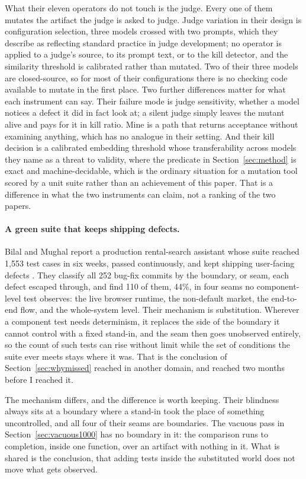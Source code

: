 \documentclass[11pt]{article}
\begin{document}
What their eleven operators do not touch is the judge. Every one of them mutates the
artifact the judge is asked to judge. Judge variation in their design is configuration
selection, three models crossed with two prompts, which they describe as reflecting standard
practice in judge development; no operator is applied to a judge's source, to its prompt
text, or to the kill detector, and the similarity threshold is calibrated rather than
mutated. Two of their three models are closed-source, so for most of their configurations
there is no checking code available to mutate in the first place. Two further differences
matter for what each instrument can say. Their failure mode is judge sensitivity, whether a
model notices a defect it did in fact look at; a silent judge simply leaves the mutant alive
and pays for it in kill ratio. Mine is a path that returns acceptance without examining
anything, which has no analogue in their setting. And their kill decision is a calibrated
embedding threshold whose transferability across models they name as a threat to validity,
where the predicate in Section~\ref{sec:method} is exact and machine-decidable, which is the
ordinary situation for a mutation tool scored by a unit suite rather than an achievement of
this paper. That is a difference in what the two instruments can claim, not a ranking of the
two papers.

\paragraph{A green suite that keeps shipping defects.} Bilal and Mughal report a production
rental-search assistant whose suite reached 1,553 test cases in six weeks, passed
continuously, and kept shipping user-facing defects \citep{bilal2026allgreen}. They classify
all 252 bug-fix commits by the boundary, or seam, each defect escaped through, and find 110
of them, 44\%, in four seams no component-level test observes: the live browser runtime, the
non-default market, the end-to-end flow, and the whole-system level. Their mechanism is
substitution. Wherever a component test needs determinism, it replaces the side of the
boundary it cannot control with a fixed stand-in, and the seam then goes unobserved
entirely, so the count of such tests can rise without limit while the set of conditions the
suite ever meets stays where it was. That is the conclusion of Section~\ref{sec:whymissed}
reached in another domain, and reached two months before I reached it.

The mechanism differs, and the difference is worth keeping. Their blindness always sits at a
boundary where a stand-in took the place of something uncontrolled, and all four of their
seams are boundaries. The vacuous pass in Section~\ref{sec:vacuous1000} has no boundary in
it: the comparison runs to completion, inside one function, over an artifact with nothing in
it. What is shared is the conclusion, that adding tests inside the substituted world does
not move what gets observed.
\end{document}
